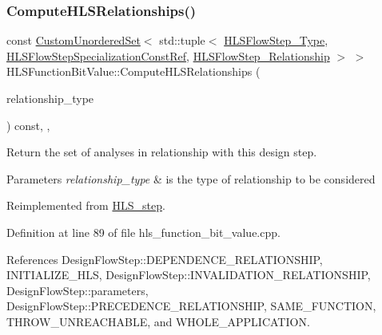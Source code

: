 \subsubsection{\texorpdfstring{Compute\+H\+L\+S\+Relationships()}{ComputeHLSRelationships()}}
{\footnotesize\ttfamily const \hyperlink{classCustomUnorderedSet}{Custom\+Unordered\+Set}$<$ std\+::tuple$<$ \hyperlink{hls__step_8hpp_ada16bc22905016180e26fc7e39537f8d}{H\+L\+S\+Flow\+Step\+\_\+\+Type}, \hyperlink{hls__step_8hpp_a5fdd2edf290c196531d21d68e13f0e74}{H\+L\+S\+Flow\+Step\+Specialization\+Const\+Ref}, \hyperlink{hls__step_8hpp_a3ad360b9b11e6bf0683d5562a0ceb169}{H\+L\+S\+Flow\+Step\+\_\+\+Relationship} $>$ $>$ H\+L\+S\+Function\+Bit\+Value\+::\+Compute\+H\+L\+S\+Relationships (\begin{DoxyParamCaption}\item[{const \hyperlink{classDesignFlowStep_a723a3baf19ff2ceb77bc13e099d0b1b7}{Design\+Flow\+Step\+::\+Relationship\+Type}}]{relationship\+\_\+type }\end{DoxyParamCaption}) const\hspace{0.3cm}{\ttfamily [override]}, {\ttfamily [private]}, {\ttfamily [virtual]}}



Return the set of analyses in relationship with this design step. 


\begin{DoxyParams}{Parameters}
{\em relationship\+\_\+type} & is the type of relationship to be considered \\
\hline
\end{DoxyParams}


Reimplemented from \hyperlink{classHLS__step_aed0ce8cca9a1ef18e705fc1032ad4de5}{H\+L\+S\+\_\+step}.



Definition at line 89 of file hls\+\_\+function\+\_\+bit\+\_\+value.\+cpp.



References Design\+Flow\+Step\+::\+D\+E\+P\+E\+N\+D\+E\+N\+C\+E\+\_\+\+R\+E\+L\+A\+T\+I\+O\+N\+S\+H\+IP, I\+N\+I\+T\+I\+A\+L\+I\+Z\+E\+\_\+\+H\+LS, Design\+Flow\+Step\+::\+I\+N\+V\+A\+L\+I\+D\+A\+T\+I\+O\+N\+\_\+\+R\+E\+L\+A\+T\+I\+O\+N\+S\+H\+IP, Design\+Flow\+Step\+::parameters, Design\+Flow\+Step\+::\+P\+R\+E\+C\+E\+D\+E\+N\+C\+E\+\_\+\+R\+E\+L\+A\+T\+I\+O\+N\+S\+H\+IP, S\+A\+M\+E\+\_\+\+F\+U\+N\+C\+T\+I\+ON, T\+H\+R\+O\+W\+\_\+\+U\+N\+R\+E\+A\+C\+H\+A\+B\+LE, and W\+H\+O\+L\+E\+\_\+\+A\+P\+P\+L\+I\+C\+A\+T\+I\+ON.

\mbox{\label{classHLSFunctionBitValue_aded992799d0c15347a1012e90ebd914a}} 
